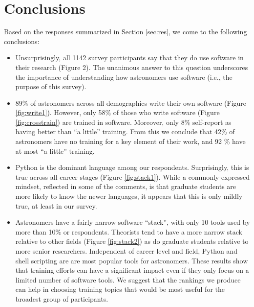 
\section{Conclusions}
\label{sec:conc}


Based on the responses summarized in Section \ref{sec:res}, we come to the following conclusions:



\begin{itemize}
\item Unsurprisingly, all 1142 survey participants say that they do use software in their research (Figure 2). The unanimous answer to this question underscores the importance of understanding how astronomers use software (i.e., the purpose of this survey).
\item $89\%$ of astronomers across all demographics write their own software (Figure \ref{fig:write1}).  However, only 58\% of those who write software (Figure \ref{fig:crosstrain}) are trained in software.  Moreover, only 8\% self-report as having better than ``a little'' training.  From this we conclude that 42\% of astronomers have no training for a key element of their work, and 92 \% have at most ``a little'' training.  
\item Python is the dominant language among our respondents.  Surprisingly, this is true across all career stages (Figure \ref{fig:stack1}).  While a commonly-expressed mindset, reflected in some of the comments, is that graduate students are more likely to know the newer languages, it appears that this is only mildly true, at least in our survey. 
\item Astronomers have a fairly narrow software ``stack'', with only 10 tools used by more than 10\% or respondents. Theorists tend to have a  more narrow stack relative to other fields (Figure \ref{fig:stack2}) as do graduate students relative to more senior researchers. Independent of career level and field, Python and shell scripting are are most popular tools for astronomers. These results show that training efforts can have a significant impact even if they only focus on a limited number of software tools. We suggest that the rankings we produce can help in choosing training topics that would be most useful for the broadest group of participants. 
\end{itemize}

